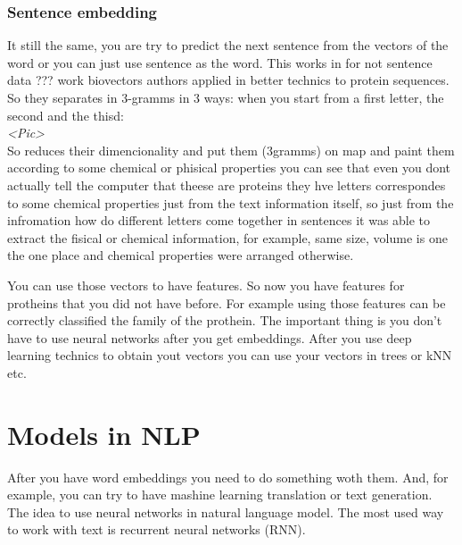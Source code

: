 %

\subsubsection*{Sentence embedding}

It still the same, you are try to predict the next sentence from the vectors of the word or you can just use sentence as the word.
This works in for not sentence data ??? work biovectors authors applied in better technics to protein sequences. So they separates in 3-gramms in 3 ways: when you start from a first letter, the second and the thisd:\\
{\it <Pic>}\\
So reduces their dimencionality and put them (3gramms) on map and paint them according to some chemical or phisical properties you can see that even you dont actually tell the computer that theese are proteins they hve letters correspondes to some chemical properties just from the text information itself, so just from the infromation how	do different letters come together in sentences it was able to extract the fisical or chemical information, for example, same size, volume is one the one place and chemical properties were arranged otherwise.

You can use those vectors to have features. So now you have features for protheins that you did not have before. For example using those features can be correctly classified the family of the prothein. The important thing is you don't have to use neural networks after you get embeddings. After you use deep learning technics to obtain yout vectors you can use your vectors in trees or kNN etc.

\section{Models in NLP}

After you have word embeddings you need to do something woth them. And, for example, you can try to have mashine learning translation or text generation. The idea to use neural networks in natural language model. {\it <GPU talk>} The most used way to work with text is recurrent neural networks (RNN).

